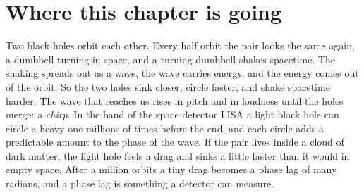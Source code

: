 \providecommand{\TwRslope}{}\renewcommand{\TwRslope}{-2.009}
\providecommand{\TwRfitDev}{}\renewcommand{\TwRfitDev}{66.42}
\providecommand{\TwfZero}{}\renewcommand{\TwfZero}{59.96}
\providecommand{\TwPNEmriN}{}\renewcommand{\TwPNEmriN}{2.79\times10^{6}}
\providecommand{\TwPNEmriOne}{}\renewcommand{\TwPNEmriOne}{1.66\times10^{5}}
\providecommand{\TwPNEmriOnefive}{}\renewcommand{\TwPNEmriOnefive}{-1.69\times10^{5}}
\providecommand{\TwPNEmrivone}{}\renewcommand{\TwPNEmrivone}{0.1289}
\providecommand{\TwPNEmrivtwo}{}\renewcommand{\TwPNEmrivtwo}{0.4082}
\providecommand{\TwPNImriN}{}\renewcommand{\TwPNImriN}{4.38\times10^{6}}
\providecommand{\TwPNImriOne}{}\renewcommand{\TwPNImriOne}{77\,847}
\providecommand{\TwPNImriOnefive}{}\renewcommand{\TwPNImriOnefive}{-44\,949}
\providecommand{\TwPNImrivone}{}\renewcommand{\TwPNImrivone}{0.06954}
\providecommand{\TwPNImrivtwo}{}\renewcommand{\TwPNImrivtwo}{0.4082}
\providecommand{\TwPNGWN}{}\renewcommand{\TwPNGWN}{2.53\times10^{6}}
\providecommand{\TwPNGWOne}{}\renewcommand{\TwPNGWOne}{5\,521}
\providecommand{\TwPNGWOnefive}{}\renewcommand{\TwPNGWOnefive}{-662}
\providecommand{\TwPNGWvone}{}\renewcommand{\TwPNGWvone}{0.02516}
\providecommand{\TwPNGWvtwo}{}\renewcommand{\TwPNGWvtwo}{0.03076}
\providecommand{\TwPNNsN}{}\renewcommand{\TwPNNsN}{16\,034}
\providecommand{\TwPNNsOne}{}\renewcommand{\TwPNNsOne}{441}
\providecommand{\TwPNNsOnefive}{}\renewcommand{\TwPNNsOnefive}{-211}
\providecommand{\TwPNNsvone}{}\renewcommand{\TwPNNsvone}{0.07567}
\providecommand{\TwPNNsvtwo}{}\renewcommand{\TwPNNsvtwo}{0.4082}
 
\section*{Where this chapter is going}
\label{T2g:sec:roadmap}\label{T2a:sec:roadmap}

Two black holes orbit each other. Every half orbit the pair looks the same again, a dumbbell turning in space, and a turning dumbbell shakes spacetime. The shaking spreads out as a wave, the wave carries energy, and the energy comes out of the orbit. So the two holes sink closer, circle faster, and shake spacetime harder. The wave that reaches us rises in pitch and in loudness until the holes merge: a \emph{chirp}. In the band of the space detector LISA a light black hole can circle a heavy one millions of times before the end, and each circle adds a predictable amount to the phase of the wave. If the pair lives inside a cloud of dark matter, the light hole feels a drag and sinks a little faster than it would in empty space. After a million orbits a tiny drag becomes a phase lag of many radians, and a phase lag is something a detector can measure.

